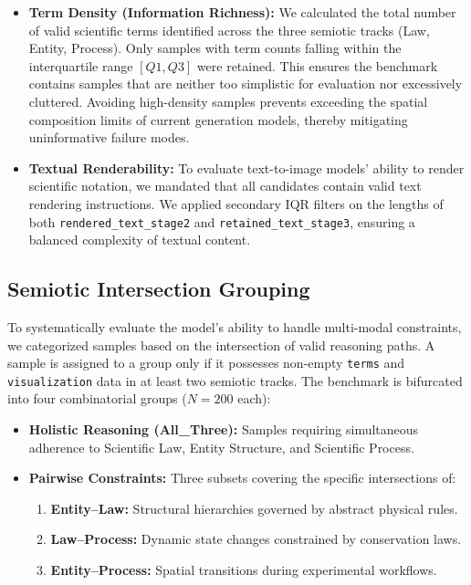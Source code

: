 \documentclass[runningheads]{llncs}
\begin{document}
\begin{itemize}
    \item \textbf{Term Density (Information Richness):} We calculated the total number of valid scientific terms identified across the three semiotic tracks (Law, Entity, Process). Only samples with term counts falling within the interquartile range $[Q1, Q3]$ were retained. This ensures the benchmark contains samples that are neither too simplistic for evaluation nor excessively cluttered. Avoiding high-density samples prevents exceeding the spatial composition limits of current generation models, thereby mitigating uninformative failure modes.
    \item \textbf{Textual Renderability:} To evaluate text-to-image models' ability to render scientific notation, we mandated that all candidates contain valid text rendering instructions. We applied secondary IQR filters on the lengths of both \texttt{rendered\_text\_stage2} and \texttt{retained\_text\_stage3}, ensuring a balanced complexity of textual content.
\end{itemize}

\subsection{Semiotic Intersection Grouping}
To systematically evaluate the model's ability to handle multi-modal constraints, we categorized samples based on the intersection of valid reasoning paths. A sample is assigned to a group only if it possesses non-empty \texttt{terms} and \texttt{visualization} data in at least two semiotic tracks. The benchmark is bifurcated into four combinatorial groups ($N=200$ each):

\begin{itemize}
    \item \textbf{Holistic Reasoning (All\_Three):} Samples requiring simultaneous adherence to Scientific Law, Entity Structure, and Scientific Process.
    \item \textbf{Pairwise Constraints:} Three subsets covering the specific intersections of:
    \begin{enumerate}
        \item \textbf{Entity--Law:} Structural hierarchies governed by abstract physical rules.
        \item \textbf{Law--Process:} Dynamic state changes constrained by conservation laws.
        \item \textbf{Entity--Process:} Spatial transitions during experimental workflows.
    \end{enumerate}
\end{itemize}
\end{document}
